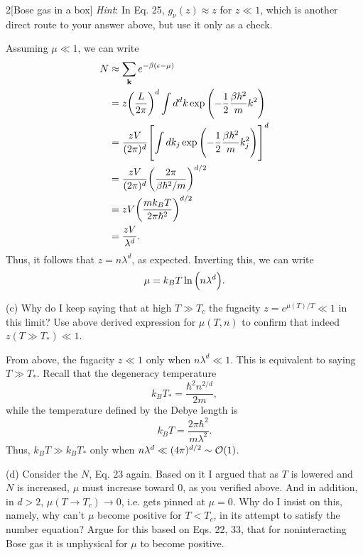 \documentclass[12pt]{article}
\begin{document}
\begin{problem}{2}[Bose gas in a box]
\textit{Hint}: In Eq. 25, $g_\nu(z)\approx z$ for $z\ll1$, which is another
direct route to your answer above, but use it only as a check.
\begin{solution}
Assuming $\mu\ll 1$, we can write
\begin{align}
    N&\approx\sum_{\vb{k}}e^{-\beta(\epsilon-\mu)}\notag\\
     &=z\qty(\frac{L}{2\pi})^d\int
     d^dk\exp\qty(-\frac12\frac{\beta\hbar^2}{m}k^2)\notag\\
     &=\frac{zV}{(2\pi)^d}\qty[\int
 dk_j\exp\qty(-\frac12\frac{\beta\hbar^2}{m}k_j^2)]^d\notag\\
     &=\frac{zV}{(2\pi)^d}\qty(\frac{2\pi}{\beta\hbar^2/m})^{d/2}\notag\\
     &=zV\qty(\frac{mk_BT}{2\pi\hbar^2})^{d/2}\notag\\
     &=\frac{zV}{\lambda^d}.
\end{align}
Thus, it follows that $z=n\lambda^d$, as expected. Inverting this, we can write
\begin{equation}
    \mu=k_BT\ln\qty(n\lambda^d). 
\end{equation}
\end{solution}

(c) Why do I keep saying that at high $T\gg T_c$ the fugacity $z=e^{\mu(T)/T}\ll
1$ in this limit? Use above derived expression for $\mu(T,n)$ to confirm that
indeed $z(T\gg T_\ast)\ll1$.
\begin{solution}
From above, the fugacity $z\ll 1$ only when $n\lambda^d\ll 1$. This is
equivalent to saying $T\gg T_\ast$. Recall that the degeneracy 
temperature
\begin{equation}
    k_BT_\ast=\frac{\hbar^2n^{2/d}}{2m}, 
\end{equation}
while the temperature defined by the Debye length is
\begin{equation}
    k_BT=\frac{2\pi\hbar^2}{m\lambda^2}. 
\end{equation}
Thus, $k_BT\gg k_BT_\ast$ only when $n\lambda^d\ll (4\pi)^{d/2}\sim\order{1}$.
\end{solution}

(d) Consider the $N$, Eq. 23 again. Based on it I argued that as $T$ is lowered
and $N$ is increased, $\mu$ must increase toward 0, as you verified above. And
in addition, in $d>2$, $\mu(T\to T_c)\to0$, i.e. gets pinned at $\mu=0$. Why do
I insist on this, namely, why can't $\mu$ become positive for $T<T_c$, in its
attempt to satisfy the number equation? Argue for this based on Eqs. 22, 33,
that for noninteracting Bose gas it is unphysical for $\mu$ to become positive.


\end{problem}
\end{document}
